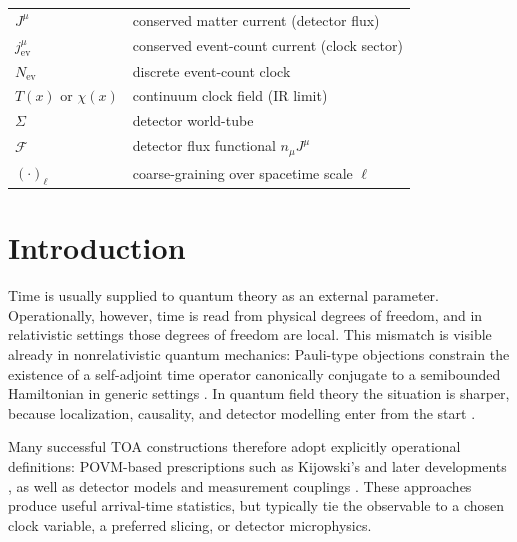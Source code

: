 \documentclass[pdflatex,sn-mathphys-num]{sn-jnl}
\theoremstyle{thmstylethree}
\theoremstyle{thmstyleone}
\theoremstyle{thmstyletwo}
\numberwithin{equation}{section}
\begin{document}
        \begin{center}
            \begin{tabular}{ll}
                $J^\mu$ & conserved matter current (detector flux) \\
                $j^\mu_{\mathrm{ev}}$ & conserved event-count current (clock sector) \\
                $N_{\mathrm{ev}}$ & discrete event-count clock \\
                $T(x)$ or $\chi(x)$ & continuum clock field (IR limit) \\
                $\Sigma$ & detector world-tube \\
                $\mathcal{F}$ & detector flux functional $n_\mu J^\mu$ \\
                $(\cdot)_\ell$ & coarse-graining over spacetime scale $\ell$
            \end{tabular}
        \end{center}

    \section{Introduction}
        
        Time is usually supplied to quantum theory as an external parameter. Operationally, however, time is read from physical degrees of freedom, and in relativistic settings those degrees of freedom are local. This mismatch is visible already in nonrelativistic quantum mechanics: Pauli-type objections constrain the existence of a self-adjoint time operator canonically conjugate to a semibounded Hamiltonian in generic settings \cite{Pauli1980,Muga2008}. In quantum field theory the situation is sharper, because localization, causality, and detector modelling enter from the start \cite{Muga2008,ColosiOeckl2025TimeOperatorTOA}.
        
        Many successful TOA constructions therefore adopt explicitly operational definitions: POVM-based prescriptions such as Kijowski's \cite{Kijowski1974} and later developments \cite{Giannitrapani1997,Muga2008}, as well as detector models and measurement couplings \cite{ColosiOeckl2025TimeOperatorTOA}. These approaches produce useful arrival-time statistics, but typically tie the observable to a chosen clock variable, a preferred slicing, or detector microphysics.
        
\end{document}
